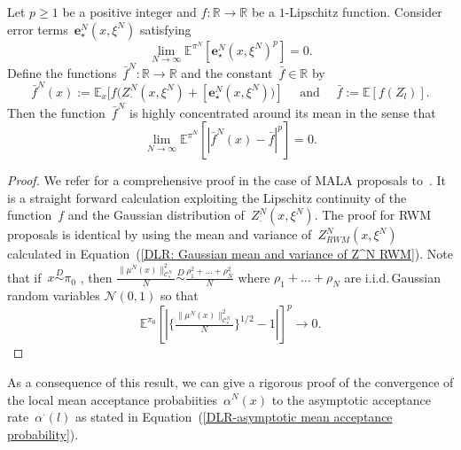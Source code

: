 \begin{lemma}\autocite[Lemma 4.5]{Pillai2012}
  \label{DLR: Lemma: Convergence of Z^N to Gaussian}
 Let $p \geq 1$ be a positive integer and $f : \mathbb{R} \to \mathbb{R}$ be a $1$-Lipschitz function. Consider error terms~$\textbf{e}^N_{\star}(x, \xi^N)$ satisfying
 \begin{equation*}
   \lim_{N \to \infty} \mathbb{E}^{\pi^N}[\textbf{e}^N_{\star}(x, \xi^N)^p] = 0.
 \end{equation*}
 Define the functions~$\bar{f}^N: \mathbb{R} \to \mathbb{R}$ and the constant~$\bar{f} \in \mathbb{R}$ by
 \begin{equation*}
   \bar{f}^N (x) := \mathbb{E}_x[f(Z^N_{\cdot} (x, \xi^N) + [\textbf{e}^N_{\star}(x, \xi^N))] \quad \text{ and } \quad \bar{f} := \mathbb{E}[f(Z_l^{\cdot})].
 \end{equation*}
 Then the function~$\bar{f}^N$ is highly concentrated around its mean in the sense that
 \begin{equation*}
   \lim_{N \to \infty} \mathbb{E}^{\pi^N}[|\bar{f}^N(x) - \bar{f}|^p] = 0.
 \end{equation*}

\end{lemma}

\begin{proof}
  We refer for a comprehensive proof in the case of MALA proposals to~\autocite[Lemma 4.5]{Pillai2012}. It is a straight forward calculation exploiting the Lipschitz continuity of the function~$f$ and the Gaussian distribution of~$Z^N_{\cdot} (x, \xi^N)$. The proof for RWM proposals is identical  by using the mean and variance of~$Z^N_{RWM} (x, \xi^N)$ calculated in Equation~(\ref{DLR: Gaussian mean and variance of Z^N RWM}). Note that if~$x \stackrel{D}{\sim} \pi_0$ , then $\tfrac{\|\mu^N(x)\|_{\mathcal{C}^N_s}^2}{N} \stackrel{D}{\sim} \frac{\rho_1^2 + \dots + \rho_N^2}{N}$ where $\rho_1 + \dots + \rho_N$ are i.i.d.\,Gaussian random variables $\mathcal{N}(0,1)$ so that 
  \begin{equation*}
\mathbb{E}^{\pi_0}[| \{\tfrac{\|\mu^N(x)\|_{\mathcal{C}^N_s}^2}{N}\}^{1/2} - 1 |]^p \to 0.
  \end{equation*}

\end{proof}


As a consequence of this result, we can give a rigorous proof of the convergence of the local mean acceptance probabiities~$\alpha^N(x)$ to the asymptotic acceptance rate~$\alpha^{\cdot}(l)$ as stated in Equation~(\ref{DLR-asymptotic mean acceptance probability}).

